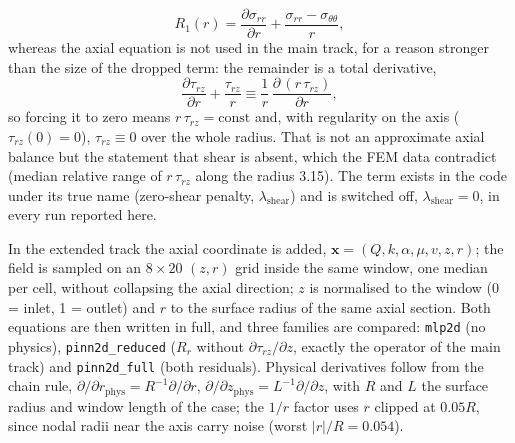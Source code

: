 \documentclass[subscriptcorrection,upint,varvw,barcolor=Goldenrod3,mathalfa=cal=euler,balance,hyphenate,french,pdf-a]{asmejour} %
\begin{document}
\begin{equation}
  R_1(r) = \frac{\partial\sigma_{rr}}{\partial r}
         + \frac{\sigma_{rr}-\sigma_{\theta\theta}}{r},
  \label{eq:eq_red}
\end{equation}
whereas the axial equation is not used in the main track, for a reason stronger
than the size of the dropped term: the remainder is a total derivative,
\begin{equation}
  \frac{\partial\tau_{rz}}{\partial r} + \frac{\tau_{rz}}{r}
  \equiv \frac{1}{r}\,\frac{\partial\,(r\,\tau_{rz})}{\partial r},
  \label{eq:identity}
\end{equation}
so forcing it to zero means $r\,\tau_{rz}=\mathrm{const}$ and, with regularity on
the axis ($\tau_{rz}(0)=0$), $\tau_{rz}\equiv0$ over the whole radius. That is not
an approximate axial balance but the statement that shear is absent, which the
FEM data contradict (median relative range of $r\,\tau_{rz}$ along the radius
3.15).
The term exists in the code under its true name (zero-shear penalty,
$\lambda_{\mathrm{shear}}$) and is switched off, $\lambda_{\mathrm{shear}}=0$, in
every run reported here.

In the extended track the axial coordinate is added,
$\mathbf{x}=(Q,k,\alpha,\mu,v,z,r)$; the field is sampled on an $8\times20$ $(z,r)$
grid inside the same window, one median per cell, without collapsing the axial
direction; $z$ is normalised to the window (0 = inlet, 1 = outlet) and $r$ to the
surface radius of the same axial section.
Both equations are then written in full, and three families are compared:
\texttt{mlp2d} (no physics), \texttt{pinn2d\_reduced} ($R_r$ without
$\partial\tau_{rz}/\partial z$, exactly the operator of the main track) and
\texttt{pinn2d\_full} (both residuals).
Physical derivatives follow from the chain rule,
$\partial/\partial r_{\mathrm{phys}}=R^{-1}\partial/\partial r$,
$\partial/\partial z_{\mathrm{phys}}=L^{-1}\partial/\partial z$, with $R$ and $L$
the surface radius and window length of the case; the $1/r$ factor uses $r$
clipped at $0.05R$, since nodal radii near the axis carry noise (worst
$|r|/R=0.054$).
\end{document}
